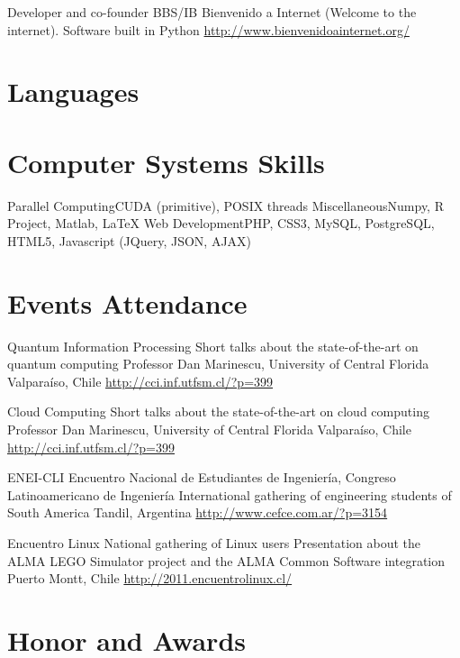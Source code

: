 \documentclass[11pt,a4paper,sans]{moderncv}
\begin{document}
        {Developer and co-founder}
        {BBS/IB Bienvenido a Internet (Welcome to the internet). Software built in Python}
        {}
        {}
        {\url{http://www.bienvenidoainternet.org/}}
        
\section{Languages}

\section{Computer Systems Skills}
           {Parallel Computing}{CUDA (primitive), POSIX threads}
           {Miscellaneous}{Numpy, R Project, Matlab, \LaTeX}
           {Web Development}{PHP, CSS3, MySQL, PostgreSQL, HTML5, Javascript (JQuery, JSON, AJAX)}

\section{Events Attendance}

        {Quantum Information Processing}
        {Short talks about the state-of-the-art on quantum computing}
        {Professor Dan Marinescu, University of Central Florida}
        {Valparaíso, Chile}
        {\url{http://cci.inf.utfsm.cl/?p=399}}
        
        {Cloud Computing}
        {Short talks about the state-of-the-art on cloud computing}
        {Professor Dan Marinescu, University of Central Florida}
        {Valparaíso, Chile}
        {\url{http://cci.inf.utfsm.cl/?p=399}}

        {ENEI-CLI}
        {Encuentro Nacional de Estudiantes de Ingeniería, Congreso Latinoamericano de Ingeniería}
        {International gathering of engineering students of South America}
        {Tandil, Argentina}
        {\url{http://www.cefce.com.ar/?p=3154}}

        {Encuentro Linux}
        {National gathering of Linux users}
        {Presentation about the ALMA LEGO Simulator project and the ALMA Common Software integration}
        {Puerto Montt, Chile}
        {\url{http://2011.encuentrolinux.cl/}}
        
\section{Honor and Awards}

\end{document}
